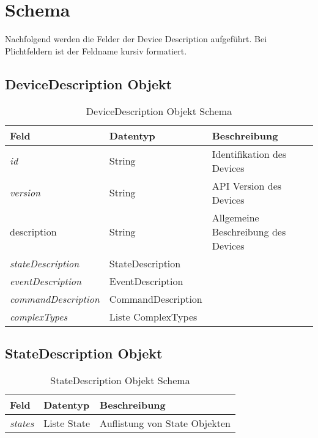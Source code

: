 \section{Schema}

Nachfolgend werden die Felder der Device Description aufgeführt. Bei Plichtfeldern ist der Feldname kursiv formatiert.

\subsection{DeviceDescription Objekt}

\begin{table}[H]
\begin{tabularx}{\textwidth}{|l|l|X|}

 \hline \rowcolor{lightgray}
 {\bf Feld } & {\bf Datentyp } & {\bf Beschreibung } \\  \hline

 \textit{id}  &   String   & Identifikation des Devices   \\ \hline

 \textit{version} & String & API Version des Devices \\ \hline

 description & String & Allgemeine Beschreibung des Devices \\ \hline 
 
 \textit{stateDescription}  &   StateDescription    &     \\ \hline
 
 \textit{eventDescription}  &   EventDescription    &     \\ \hline
  
 \textit{commandDescription}  &   CommandDescription    &     \\ \hline
 
 \textit{complexTypes}  &   Liste ComplexTypes    &     \\ \hline
 
\end{tabularx}
\caption{DeviceDescription Objekt Schema}
\end{table}

\subsection{StateDescription Objekt}
\begin{table}[H]
\begin{tabularx}{\textwidth}{|l|l|X|}

 \hline \rowcolor{lightgray}
 {\bf Feld } & {\bf Datentyp } & {\bf Beschreibung } \\  \hline

 \textit{states}  &   Liste State   & Auflistung von State Objekten   \\ \hline

\end{tabularx}
\caption{StateDescription Objekt Schema}
\end{table}

